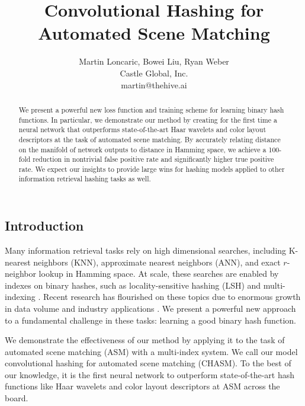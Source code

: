 \documentclass{article}
\title{Convolutional Hashing for Automated Scene Matching}
\author{Martin Loncaric, Bowei Liu, Ryan Weber \\ Castle Global, Inc. \\ martin@thehive.ai}
\date{}
\begin{document}
\maketitle

\begin{multicols}{2}
\begin{abstract}
We present a powerful new loss function and training scheme for learning binary hash functions.
In particular, we demonstrate our method by creating for the first time a neural network that outperforms state-of-the-art Haar wavelets and color layout descriptors at the task of automated scene matching.
By accurately relating distance on the manifold of network outputs to distance in Hamming space, we achieve a 100-fold reduction in nontrivial false positive rate and significantly higher true positive rate.
We expect our insights to provide large wins for hashing models applied to other information retrieval hashing tasks as well.
\end{abstract}

\section{Introduction}

Many information retrieval tasks rely on high dimensional searches, including K-nearest neighbors (KNN), approximate nearest neighbors (ANN), and exact $r$-neighbor lookup in Hamming space.
At scale, these searches are enabled by indexes on binary hashes, such as locality-sensitive hashing (LSH) and multi-indexing \cite{multi12}.
Recent research has flourished on these topics due to enormous growth in data volume and industry applications \cite{big_data16}.
We present a powerful new approach to a fundamental challenge in these tasks: learning a good binary hash function.

We demonstrate the effectiveness of our method by applying it to the task of automated scene matching (ASM) with a multi-index system.
We call our model convolutional hashing for automated scene matching (CHASM).
To the best of our knowledge, it is the first neural network to outperform state-of-the-art hash functions like Haar wavelets and color layout descriptors at ASM across the board.


\end{multicols}
\end{document}
